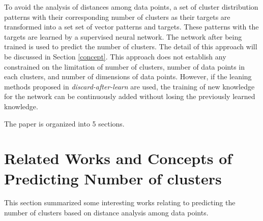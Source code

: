 \documentclass[lettersize,journal]{IEEEtran}
\begin{document}
\IEEEpubidadjcol
To avoid the analysis of distances among data points, a set of cluster distribution patterns with
their corresponding number of clusters as their targets are
transformed into a set set of vector patterns and targets. These patterns with the targets are learned 
by a supervised neural network. The network after being trained is used to predict the number of clusters.
The detail of this approach will be discussed in Section \ref{concept}. This approach does not
establish any constrained on the limitation of number of clusters, number of data points in each clusters,
and number of dimensions of data points. However, if the leaning methods proposed in 
{\em discard-after-learn} \cite{Prem}\cite{Mongkhon} are used, the training of new knowledge for the 
network can be continuously added without losing the previously learned knowledge.

The paper is organized into 5 sections.


\section{Related Works and Concepts of Predicting Number of clusters}

This section summarized some interesting works relating to predicting the number of clusters based on 
distance analysis among data points.

\IEEEpubidadjcol
\end{document}
